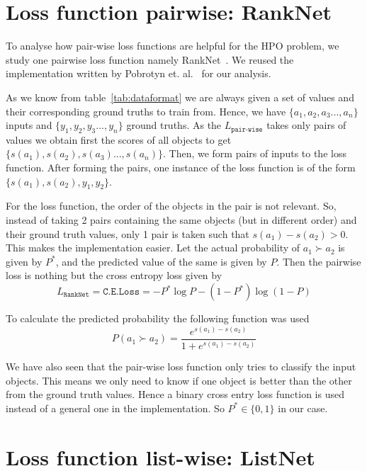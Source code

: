 \documentclass[12pt, twoside, ngerman]{report}
\begin{document}
\section{Loss function pairwise: RankNet}

To analyse how pair-wise loss functions are helpful for the HPO problem,
we study one pairwise loss function namely RankNet~\cite{ranknetpaper}.
We reused the implementation written by Pobrotyn et. al.~\cite{Pobrotyn2020ContextAwareLT} for our analysis.

As we know from table~\ref{tab:dataformat} we are always given a set of values and their corresponding ground truths to train from.
Hence, we have $\{a_1, a_2, a_3..., a_n\}$ inputs and $\{y_1, y_2, y_3..., y_n\}$ ground truths.
As the $L_{\texttt{pair-wise}}$ takes only pairs of values we obtain first the scores of all objects to get $\{s(a_1), s(a_2), s(a_3)..., s(a_n)\}$.
Then,  we form pairs of inputs to the loss function.
After forming the pairs, one instance of the loss function is of the form$\{s(a_1), s(a_2), y_1, y_2\}$.

For the loss function,  the order of the objects in the pair is not relevant.
So,  instead of taking 2 pairs containing the same objects (but in different order) and their ground truth values,  only 1 pair is taken such that $s(a_1) - s(a_2) > 0$.
This makes the implementation easier.
Let the actual probability of $a_1 \succ a_2$ is given by $P^*$,  and the predicted value of the same is given by $P$.
Then the pairwise loss is nothing but the cross entropy loss given by
\begin{equation}
L_{\texttt{RankNet}} = \texttt{C.E.Loss} = -P^*\log P - (1 - P^*)\log(1-P)
\end{equation}

To calculate the predicted probability the following function was used
\begin{equation}
\label{eq:pairwiseprobability}
P(a_1 \succ a_2) = \frac{e^{s(a_1) - s(a_2)}}{1 + e^{s(a_1) - s(a_2)} }
\end{equation}

We have also seen that the pair-wise loss function only tries to classify the input objects.
This means we only need to know if one object is better than the other from the ground truth values.
Hence a binary cross entry loss function is used instead of a general one in the implementation.
So $P^* \in \{0, 1\}$ in our case.

\section{Loss function list-wise: ListNet}
\end{document}
